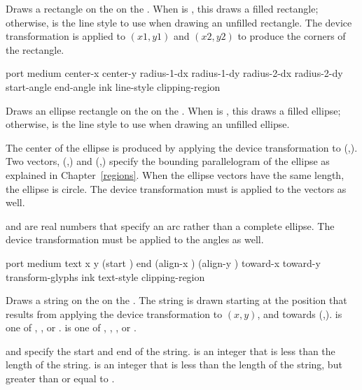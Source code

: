 Draws a rectangle on the   on the 
.  When  is , this draws a filled rectangle;
otherwise,  is the line style to use when drawing an unfilled
rectangle.  The device transformation is applied to $(x1,y1)$ and $(x2,y2)$ to
produce the corners of the rectangle.

 {port medium 
                                  center-x center-y 
                                  radius-1-dx radius-1-dy radius-2-dx radius-2-dy
                                  start-angle end-angle
                                  \optional ink line-style clipping-region}

Draws an ellipse rectangle on the   on the 
.  When  is , this draws a filled ellipse;
otherwise,  is the line style to use when drawing an unfilled
ellipse.  

The center of the ellipse is produced by applying the device transformation to
(,). Two vectors,
(,) and (,)
specify the bounding parallelogram of the ellipse as explained in
Chapter~\ref{regions}.  When the ellipse vectors have the same length, the
ellipse is circle.  The device transformation must is applied to the vectors as
well.

 and  are real numbers that specify an arc
rather than a complete ellipse.  The device transformation must be applied to
the angles as well.

 {port medium text x y
                                (start ) end
                                (align-x ) (align-y )
                                toward-x toward-y transform-glyphs
                                \optional ink text-style clipping-region}

Draws a string on the   on the  .
The string is drawn starting at the position that results from applying the
device transformation to $(x,y)$, and towards (,).
 is one of , , or .  
is one of , , , or .

 and  specify the start and end of the string.  
is an integer that is less than the length of the string.   is an
integer that is less than the length of the string, but greater than or equal to
.

